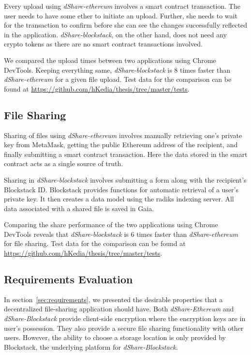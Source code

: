 		Every upload using \textit{dShare-ethereum} involves a smart contract transaction. The user needs to have some ether to initiate an upload. Further, she needs to wait for the transaction to confirm before she can see the changes successfully reflected in the application. \textit{dShare-blockstack}, on the other hand, does not need any crypto tokens as there are no smart contract transactions involved.
		
		We compared the upload times between two applications using Chrome DevTools\cite{dev:chrome:perf:2}. Keeping everything same, \textit{dShare-blockstack} is 8 times faster than \textit{dShare-ethereum} for a given file upload. Test data for the comparison can be found at \url{https://github.com/hKedia/thesis/tree/master/tests}.
		
		\subsection{File Sharing}
			Sharing of files using \textit{dShare-ethereum} involves manually retrieving one's private key from MetaMask, getting the public Ethereum address of the recipient, and finally submitting a smart contract transaction. Here the data stored in the smart contract acts as a single source of truth.
			
			Sharing in \textit{dShare-blockstack} involves submitting a form along with the recipient's Blockstack ID. Blockstack provides functions for automatic retrieval of a user's private key. It then creates a data model using the radiks indexing server. All data associated with a shared file is saved in Gaia.
			
			Comparing the share performance of the two applications using Chrome DevTools reveals that \textit{dShare-blockstack} is 6 times faster than \textit{dShare-ethereum} for file sharing. Test data for the comparison can be found at \url{https://github.com/hKedia/thesis/tree/master/tests}.
			
		\subsection{Requirements Evaluation}
			In section~\ref{sec:requirements}, we presented the desirable properties that a decentralized file-sharing application should have. Both \textit{dShare-Ethereum} and \textit{dShare-Blockstack} provide client-side encryption where the encryption keys are in user's possession. They also provide a secure file sharing functionality with other users. However, the ability to choose a storage location is only provided by Blockstack, the underlying platform for \textit{dShare-Blockstack}.
			
